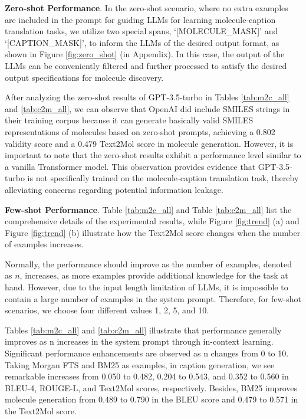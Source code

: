 \documentclass{article}
\theoremstyle{plain}
\theoremstyle{definition}
\theoremstyle{remark}
\begin{document}
\textbf{Zero-shot Performance}. 
In the zero-shot scenario, where no extra examples are included in the prompt for guiding LLMs for learning molecule-caption translation tasks, we utilize two special spans, `[MOLECULE\_MASK]' and `[CAPTION\_MASK]', to inform the LLMs of the desired output format, as shown in Figure \ref{fig:zero_shot} (in Appendix). In this case, the output of the LLMs can be conveniently filtered and further processed to satisfy the desired output specifications for molecule discovery.

After analyzing the zero-shot results of GPT-3.5-turbo in Tables \ref{tab:m2c_all} and \ref{tab:c2m_all}, we can observe that OpenAI did include SMILES strings in their training corpus because it can generate basically valid SMILES representations of molecules based on zero-shot prompts, achieving a 0.802 validity score and a 0.479 Text2Mol score in molecule generation.
However, it is important to note that the zero-shot results exhibit a performance level similar to a vanilla Transformer model. This observation provides evidence that GPT-3.5-turbo is not specifically trained on the molecule-caption translation task, thereby alleviating concerns regarding potential information leakage.




\textbf{Few-shot Performance}. 
 Table \ref{tab:m2c_all} and Table \ref{tab:c2m_all} list the comprehensive details of the experimental results, while Figure \ref{fig:trend} (a) and Figure \ref{fig:trend} (b) illustrate how the Text2Mol score changes when the number of examples increases.


Normally, the performance should improve as the number of examples, denoted as \(n\), increases, as more examples provide additional knowledge for the task at hand. 
However, due to the input length limitation of LLMs, it is impossible to contain a large number of examples in the system prompt. 
Therefore, for few-shot scenarios, we choose four different values 1, 2, 5, and 10. 

Tables \ref{tab:m2c_all} and \ref{tab:c2m_all} illustrate that performance generally improves as n increases  in the system prompt through in-context learning. Significant performance enhancements are observed as n changes from 0 to 10. 
Taking Morgan FTS and BM25 as examples, in caption generation, we see remarkable increases from 0.050 to 0.482, 0.204 to 0.543, and 0.352 to 0.560 in BLEU-4, ROUGE-L, and Text2Mol scores, respectively.
Besides, BM25 improves molecule generation from 0.489 to 0.790 in the BLEU score and 0.479 to 0.571 in the Text2Mol score.
\end{document}

